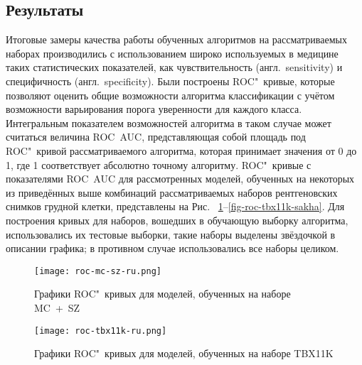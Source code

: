\subsection{Результаты}

Итоговые замеры качества работы обученных алгоритмов на рассматриваемых наборах производились с использованием широко используемых в медицине таких статистических показателей, как чувствительность (англ.~sensitivity) и специфичность (англ.~specificity). Были построены ROC"~кривые, которые позволяют оценить общие возможности алгоритма классификации с учётом возможности варьирования порога уверенности для каждого класса. Интегральным показателем возможностей алгоритма в таком случае может считаться величина ROC~AUC, представляющая собой площадь под ROC"~кривой рассматриваемого алгоритма, которая принимает значения от 0 до 1, где 1 соответствует абсолютно точному алгоритму. ROC"~кривые с показателями ROC~AUC для рассмотренных моделей, обученных на некоторых из приведённых выше комбинаций рассматриваемых наборов рентгеновских снимков грудной клетки, представлены на Рис.~
\ref{fig-roc-mc-sz}--\ref{fig-roc-tbx11k-sakha}.
Для построения кривых для наборов, вошедших в обучающую выборку алгоритма, использовались их тестовые выборки, такие наборы выделены звёздочкой в описании графика; в противном случае использовались все наборы целиком.

\begin{figure}[ht]%
	\centering
	\texttt{[image: roc-mc-sz-ru.png]}
	\caption{Графики ROC"~кривых для моделей, обученных на наборе MC~+~SZ}\label{fig-roc-mc-sz}
\end{figure}
%
%
\begin{figure}[ht]%
	\centering
	\texttt{[image: roc-tbx11k-ru.png]}
	\caption{Графики ROC"~кривых для моделей, обученных на наборе TBX11K}\label{fig-roc-tbx11k}
\end{figure}


